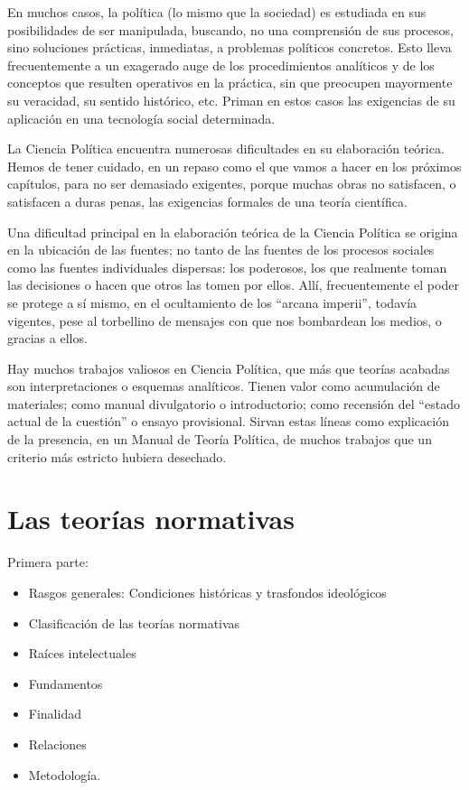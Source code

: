 \documentclass[
]{book}
\providecommand{\tightlist}{%
  \setlength{\itemsep}{0pt}\setlength{\parskip}{0pt}}
\begin{document}
En muchos casos, la política (lo mismo que la sociedad) es estudiada en sus posibilidades de ser manipulada, buscando, no una comprensión de sus procesos, sino soluciones prácticas, inmediatas, a problemas políticos concretos. Esto lleva frecuentemente a un exagerado auge de los procedimientos analíticos y de los conceptos que resulten operativos en la práctica, sin que preocupen mayormente su veracidad, su sentido histórico, etc. Priman en estos casos las exigencias de su aplicación en una tecnología social determinada.

La Ciencia Política encuentra numerosas dificultades en su elaboración teórica. Hemos de tener cuidado, en un repaso como el que vamos a hacer en los próximos capítulos, para no ser demasiado exigentes, porque muchas obras no satisfacen, o satisfacen a duras penas, las exigencias formales de una teoría científica.

Una dificultad principal en la elaboración teórica de la Ciencia Política se origina en la ubicación de las fuentes; no tanto de las fuentes de los procesos sociales como las fuentes individuales dispersas: los poderosos, los que realmente toman las decisiones o hacen que otros las tomen por ellos. Allí, frecuentemente el poder se protege a sí mismo, en el ocultamiento de los ``arcana imperii'', todavía vigentes, pese al torbellino de mensajes con que nos bombardean los medios, o gracias a ellos.

Hay muchos trabajos valiosos en Ciencia Política, que más que teorías acabadas son interpretaciones o esquemas analíticos. Tienen valor como acumulación de materiales; como manual divulgatorio o introductorio; como recensión del ``estado actual de la cuestión'' o ensayo provisional. Sirvan estas líneas como explicación de la presencia, en un Manual de Teoría Política, de muchos trabajos que un criterio más estricto hubiera desechado.

\hypertarget{Lasteoruxedasnormativas}{%
\chapter{Las teorías normativas}\label{Lasteoruxedasnormativas}}

Primera parte:

\begin{itemize}
\tightlist
\item
  Rasgos generales: Condiciones históricas y trasfondos ideológicos
\item
  Clasificación de las teorías normativas
\item
  Raíces intelectuales
\item
  Fundamentos
\item
  Finalidad
\item
  Relaciones
\item
  Metodología.
\end{itemize}
\end{document}

